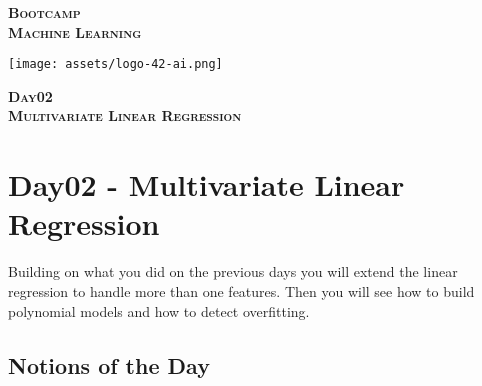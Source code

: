 \documentclass[]{article}
\date{}
\begin{document}

\vspace*{2cm}
\begin{center}
    \textsc{\fontsize{40}{48} \bfseries Bootcamp}\\[0.6cm]
    \textsc{\fontsize{39}{48} \bfseries { %
Machine Learning
    }}\\[0.3cm]
\end{center}
\vspace{3cm}

\begin{center}
\texttt{[image: assets/logo-42-ai.png]}{\centering}
\end{center}

\vspace*{2cm}
\begin{center}
    \textsc{\fontsize{32}{48} \bfseries %
Day02    
    }\\[0.6cm]
    \textsc{\fontsize{32}{48} \bfseries %
Multivariate Linear Regression    
    }\\[0.3cm]
\end{center}
\vspace{3cm}

\newpage

\setcounter{page}{1}



\hypertarget{day02---multivariate-linear-regression}{%
\section{Day02 - Multivariate Linear
Regression}\label{day02---multivariate-linear-regression}}

Building on what you did on the previous days you will extend the linear
regression to handle more than one features. Then you will see how to
build polynomial models and how to detect overfitting.

\hypertarget{notions-of-the-day}{%
\subsection{Notions of the Day}\label{notions-of-the-day}}
\end{document}
